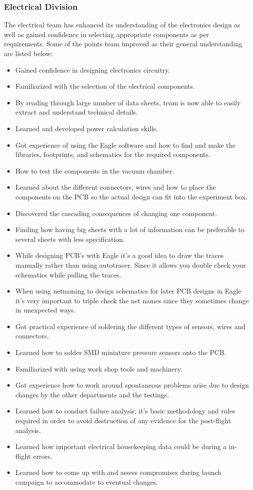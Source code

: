 \subsubsection{Electrical Division}
The electrical team has enhanced its understanding of the electronics design as well as gained confidence in selecting appropriate components as per requirements. Some of the points team improved as their general understanding are listed below:  
\begin{itemize}

    \item Gained confidence in designing electronics circuitry.
    \item Familiarized with the selection of the electrical components. 
    \item By reading through large number of data sheets, team is now able to easily extract and understand technical details. 
    \item Learned and developed power calculation skills.
    \item Got experience of using the Eagle software and how to find and make the libraries, footprints, and schematics for the required components.
    \item How to test the components in the vacuum chamber.
    \item Learned about the different connectors, wires and how to place the components on the PCB so the actual design can fit into the experiment box.
    \item Discovered the cascading consequences of changing one component.
    \item Finding how having big sheets with a lot of information can be preferable to several sheets with less specification.
    \item While designing PCB's with Eagle it's a good idea to draw the traces manually rather than using autotracer. Since it allows you double check your schematics while pulling the traces.
    \item When using netnaming to design schematics for later PCB designs in Eagle it's very important to triple check the net names since they sometimes change in unexpected ways.
    \item Got practical experience of soldering the different types of sensors, wires and connectors. 
    \item Learned how to solder SMD miniature pressure sensors onto the PCB.
    \item Familiarized with using work shop tools and machinery.
    \item Got experience how to work around spontaneous problems arise due to design changes by the other departments and the testings. 
    \item Learned how to conduct failure analysis; it's basic methodology and rules required in order to avoid destruction of any evidence for the post-flight analysis. 
    \item Learned how important electrical housekeeping data could be during a in-flight errors.
    \item Learned how to come up with and assess compromises during launch campaign to accommodate to eventual changes.
    

\end{itemize}

